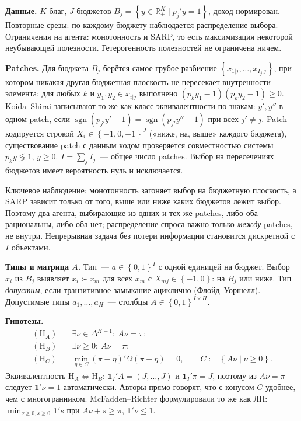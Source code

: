 \documentclass[a4paper,11pt]{article}
\theoremstyle{plain}
\theoremstyle{definition}
\theoremstyle{remark}
\newcommand{\R}{\mathbb{R}}
\newcommand{\set}[1]{\left\{ #1 \right\}}
\newcommand{\Rp}[1][2]{\R^{#1}_{+}}   %
\begin{document}
\textbf{Данные.} $K$ благ, $J$ бюджетов $B_j=\set{y\in\Rp[K]\mid p_j'y=1}$, доход нормирован. Повторные срезы: по каждому бюджету наблюдается распределение выбора. Ограничения на агента: монотонность и SARP, то есть максимизация некоторой неубывающей полезности. Гетерогенность полезностей не ограничена ничем.

\textbf{Patches.} Для бюджета $B_j$ берётся самое грубое разбиение $\set{x_{1|j},\dots,x_{I_j|j}}$, при котором никакая другая бюджетная плоскость не пересекает внутренности элемента: для любых $k$ и $y_1,y_2\in x_{i|j}$ выполнено $(p_ky_1-1)(p_ky_2-1)\ge0$. Koida--Shirai записывают то же как класс эквивалентности по знакам: $y',y''$ в одном patch, если $\operatorname{sgn}(p_{j'}y'-1)=\operatorname{sgn}(p_{j'}y''-1)$ при всех $j'\ne j$. Patch кодируется строкой $X_i\in\set{-1,0,+1}^J$ («ниже, на, выше» каждого бюджета), существование patch с данным кодом проверяется совместностью системы $p_ky\lessgtr1$, $y\ge0$. $I=\sum_jI_j$~--- общее число patches. Выбор на пересечениях бюджетов имеет вероятность нуль и исключается.

Ключевое наблюдение: монотонность загоняет выбор на бюджетную плоскость, а SARP зависит только от того, выше или ниже каких бюджетов лежит выбор. Поэтому два агента, выбирающие из одних и тех же patches, либо оба рациональны, либо оба нет; распределение спроса важно только \emph{между} patches, не внутри. Непрерывная задача без потери информации становится дискретной с $I$ объектами.

\textbf{Типы и матрица $A$.} Тип~--- $a\in\set{0,1}^I$ с одной единицей на бюджет. Выбор $x_i$ из $B_j$ выявляет $x_i\succ x_m$ для всех $x_m$ с $X_{mj}\in\set{-1,0}$: на $B_j$ или ниже. Тип \textit{допустим}, если транзитивное замыкание ациклично (Флойд--Уоршелл). Допустимые типы $a_1,\dots,a_H$~--- столбцы $A\in\set{0,1}^{I\times H}$.

\textbf{Гипотезы.}
\begin{align*}
    (\mathrm H_A)&\quad \exists\nu\in\Delta^{H-1}:\ A\nu=\pi;\\
    (\mathrm H_B)&\quad \exists\nu\ge0:\ A\nu=\pi;\\
    (\mathrm H_C)&\quad \min_{\eta\in C}(\pi-\eta)'\Omega(\pi-\eta)=0,\qquad C:=\set{A\nu\mid\nu\ge0}.
\end{align*}
Эквивалентность $\mathrm H_A\Leftrightarrow\mathrm H_B$: $\mathbf 1_I'A=(J,\dots,J)$ и $\mathbf 1_I'\pi=J$, поэтому из $A\nu=\pi$ следует $\mathbf 1'\nu=1$ автоматически. Авторы прямо говорят, что с конусом $C$ удобнее, чем с многогранником. McFadden--Richter формулировали то же как ЛП: $\min_{\nu\ge0,s\ge0}\mathbf 1's$ при $A\nu+s\ge\pi$, $\mathbf 1'\nu\le1$.
\end{document}

